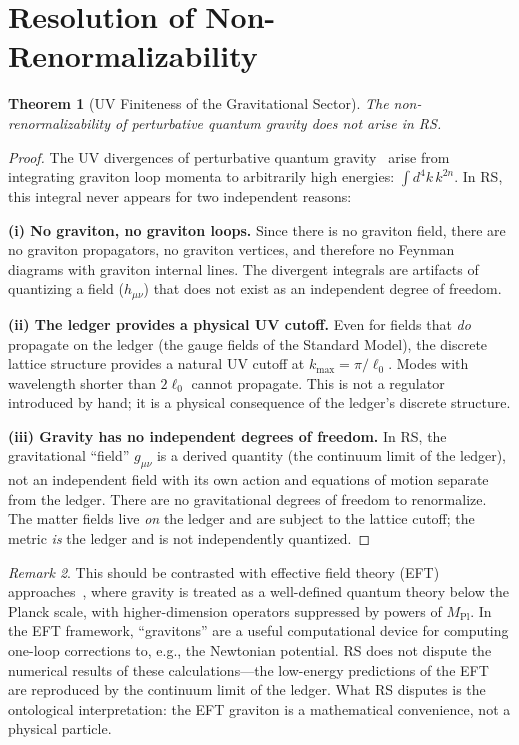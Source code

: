 \documentclass[12pt,a4paper]{article}
\newtheorem{theorem}{Theorem}[section]
\theoremstyle{definition}
\theoremstyle{remark}
\newtheorem{remark}[theorem]{Remark}
\begin{document}
\section{Resolution of Non-Renormalizability}
\label{sec:renorm}

\begin{theorem}[UV Finiteness of the Gravitational Sector]
\label{thm:uv-finite}
The non-renormalizability of perturbative quantum gravity does
not arise in RS.
\end{theorem}

\begin{proof}
The UV divergences of perturbative quantum
gravity~\cite{Goroff1986} arise from integrating graviton loop
momenta to arbitrarily high energies:
$\int d^4k\, k^{2n}$.  In RS, this integral never appears for
two independent reasons:

\textbf{(i) No graviton, no graviton loops.}
Since there is no graviton field, there are no graviton
propagators, no graviton vertices, and therefore no Feynman
diagrams with graviton internal lines.  The divergent integrals
are artifacts of quantizing a field ($h_{\mu\nu}$) that does not
exist as an independent degree of freedom.

\textbf{(ii) The ledger provides a physical UV cutoff.}
Even for fields that \emph{do} propagate on the ledger (the
gauge fields of the Standard Model), the discrete lattice
structure provides a natural UV cutoff at
$k_{\max} = \pi/\ell_0$.  Modes with wavelength shorter than
$2\ell_0$ cannot propagate.  This is not a regulator introduced
by hand; it is a physical consequence of the ledger's discrete
structure.

\textbf{(iii) Gravity has no independent degrees of freedom.}
In RS, the gravitational ``field'' $g_{\mu\nu}$ is a derived
quantity (the continuum limit of the ledger), not an independent
field with its own action and equations of motion separate from
the ledger.  There are no gravitational degrees of freedom to
renormalize.  The matter fields live \emph{on} the ledger and
are subject to the lattice cutoff; the metric \emph{is} the
ledger and is not independently quantized.
\end{proof}

\begin{remark}
This should be contrasted with effective field theory (EFT)
approaches~\cite{Donoghue1994}, where gravity is treated as a
well-defined quantum theory below the Planck scale, with
higher-dimension operators suppressed by powers of $M_{\mathrm{Pl}}$.
In the EFT framework, ``gravitons'' are a useful computational
device for computing one-loop corrections to, e.g., the
Newtonian potential.  RS does not dispute the numerical results
of these calculations---the low-energy predictions of the EFT
are reproduced by the continuum limit of the ledger.  What RS
disputes is the ontological interpretation: the EFT graviton is
a mathematical convenience, not a physical particle.
\end{remark}
\end{document}
